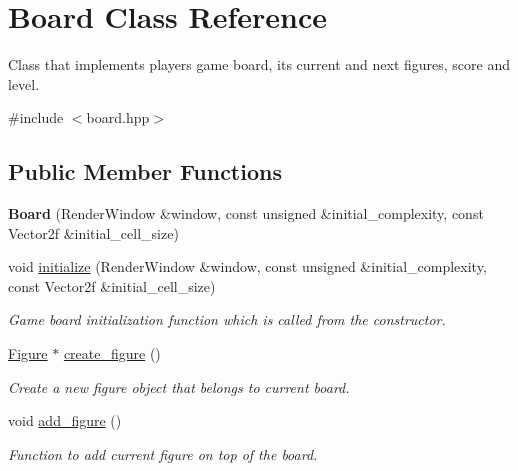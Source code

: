 \hypertarget{classBoard}{}\section{Board Class Reference}
\label{classBoard}


Class that implements player\textquotesingle{}s game board, its current and next figures, score and level.  




{\ttfamily \#include $<$board.\+hpp$>$}

\subsection*{Public Member Functions}
\begin{DoxyCompactItemize}
\item 
\mbox{\label{classBoard_a6ad1219cf5bdf6a569cef13bac98b80f}} 
{\bfseries Board} (Render\+Window \&window, const unsigned \&initial\+\_\+complexity, const Vector2f \&initial\+\_\+cell\+\_\+size)
\item 
void \hyperlink{classBoard_a2a65a2e04ad3cb7c8712ed8ae9c89d3b}{initialize} (Render\+Window \&window, const unsigned \&initial\+\_\+complexity, const Vector2f \&initial\+\_\+cell\+\_\+size)
\begin{DoxyCompactList}\small\item\em Game board initialization function which is called from the constructor. \end{DoxyCompactList}\item 
\hyperlink{classFigure}{Figure} $\ast$ \hyperlink{classBoard_a7bdc3cbf8ac673c245d5bf8f99c79b51}{create\+\_\+figure} ()
\begin{DoxyCompactList}\small\item\em Create a new figure object that belongs to current board. \end{DoxyCompactList}\item 
\mbox{\label{classBoard_a6045168c4b4240dc6d10e4dec44b788b}} 
void \hyperlink{classBoard_a6045168c4b4240dc6d10e4dec44b788b}{add\+\_\+figure} ()
\begin{DoxyCompactList}\small\item\em Function to add current figure on top of the board. \end{DoxyCompactList}\item 
\mbox{\label{classBoard_a289b43d0420cd48cb1b3488426a3307c}} 

\end{DoxyCompactItemize}
